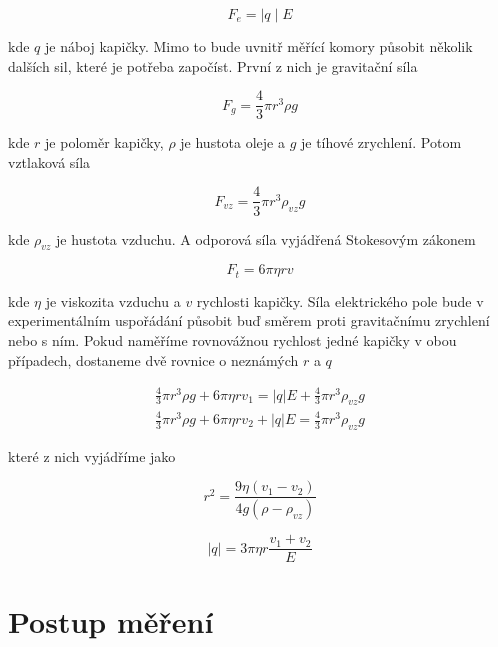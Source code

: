 \documentclass[a4paper,11pt]{article}
\begin{document}
\begin{equation}
F_e =  \mid q \mid E
\end{equation}

\noindent
kde $ q $ je náboj kapičky. Mimo to bude uvnitř měřící komory působit několik dalších sil, které je potřeba započíst. První z nich je gravitační síla

\begin{equation}
F_g = \frac{4}{3} \pi r^{3} \rho g
\end{equation}

\noindent
kde $ r $ je poloměr kapičky, $ \rho $ je hustota oleje a $ g $ je tíhové zrychlení. Potom vztlaková síla

\begin{equation}
F_{vz} =  \frac{4}{3} \pi r^{3} \rho_{vz} g
\end{equation}

\noindent
kde $ \rho_{vz} $ je hustota vzduchu. A odporová síla vyjádřená Stokesovým zákonem

\begin{equation}
 F_t = 6 \pi \eta r v
\end{equation}

\noindent
kde $ \eta $ je viskozita vzduchu a $ v $ rychlosti kapičky. Síla elektrického pole bude v experimentálním uspořádání působit buď směrem proti gravitačnímu zrychlení nebo s ním. Pokud naměříme rovnovážnou rychlost jedné kapičky v obou případech, dostaneme dvě rovnice o neznámých $ r $ a $ q $ 

\begin{align*}
    \frac{4}{3} \pi r^{3} \rho g + 6 \pi \eta r v_1 = | q |  E + \frac{4}{3} \pi r^{3} \rho_{vz} g \\
    \frac{4}{3} \pi r^{3} \rho g + 6 \pi \eta r v_2  + | q |  E = \frac{4}{3} \pi r^{3} \rho_{vz} g
\end{align*}

\noindent
které z nich vyjádříme jako

\begin{equation}
r^2 = \frac{9 \eta (v_1 - v_2) }{4 g (\rho - \rho_{vz})}
\end{equation}

\begin{equation}
|q| = 3 \pi \eta r \frac{v_1 + v_2}{E}
\end{equation}

\section{Postup měření}
\end{document}
